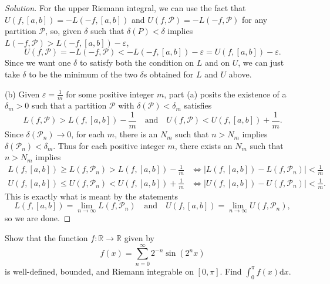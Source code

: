 \documentclass[11pt]{article}
\newcommand{\dd}{\mathrm{d}}
\providecommand{\eps}{\varepsilon}
\providecommand{\RR}{\mathbb R}
\newenvironment{soln}{\begin{proof}[Solution]}{\end{proof}}
\providecommand{\abs}[1]{\left|#1\right|}
\begin{document}
\begin{soln}
    For the upper Riemann integral, we can use the fact that
    $U(f,[a,b]) = -L(-f,[a,b])$ and $U(f,\mathcal P) = -L(-f,\mathcal P)$
    for any partition $\mathcal P$, so, given $\delta$ such that
    $\delta(P) < \delta$ implies $L(-f,\mathcal P) > L(-f,[a,b]) - \eps$,
    \begin{equation*}
	U(f,\mathcal P) = -L(-f,\mathcal P) < -L(-f, [a,b]) - \eps
	= U(f,[a,b]) - \eps.
    \end{equation*}
    Since we want one $\delta$ to satisfy both the condition on $L$ and on $U$,
    we can just take $\delta$ to be the minimum of the two $\delta$s obtained
    for $L$ and $U$ above.

    (b) Given $\eps = \frac 1m$ for some positive integer $m$,
    part (a) posits the existence of a $\delta_m > 0$ such that
    a partition $\mathcal P$ with $\delta(\mathcal P) < \delta_m$ satisfies
    \begin{equation*}
	L(f,\mathcal P) > L(f,[a,b]) - \frac 1m
	\quad\text{and}\quad
	U(f,\mathcal P) < U(f,[a,b]) + \frac 1m.
    \end{equation*}
    Since $\delta(\mathcal P_n)\to 0$, for each $m$, there is an $N_m$
    such that $n > N_m$ implies $\delta(\mathcal P_n) < \delta_m$.
    Thus for each positive integer $m$,
    there exists an $N_m$ such that $n > N_m$ implies
    \begin{align*}
	L(f,[a,b]) \ge L(f,\mathcal P_n) > L(f,[a,b]) - \frac 1m
	&\iff \abs{L(f,[a,b]) - L(f,\mathcal P_n)} < \frac 1m\\
	U(f,[a,b]) \le U(f,\mathcal P_n) < U(f,[a,b]) + \frac 1m
	&\iff \abs{U(f,[a,b]) - U(f,\mathcal P_n)} < \frac 1m.
    \end{align*}
    This is exactly what is meant by the statements
    \begin{equation*}
	L(f,[a,b]) = \lim_{n\to\infty} L(f,\mathcal P_n)
	\quad\text{and}\quad
	U(f,[a,b]) = \lim_{n\to\infty} U(f,\mathcal P_n),
    \end{equation*}
    so we are done.
\end{soln}

\pagebreak

\begin{problem}
    Show that the function $f\colon\RR\to\RR$ given by
    \begin{equation*}
	f(x) = \sum_{n=0}^\infty 2^{-n}\sin(2^nx)
    \end{equation*}
    is well-defined, bounded, and Riemann integrable on $[0,\pi]$.
    Find $\int_0^\pi f(x) \dd x$.
\end{problem}
\end{document}
